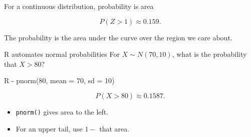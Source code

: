 \documentclass[11pt,aspectratio=169]{beamer}
\begin{document}
\begin{frame}{For a continuous distribution, probability is area}
\begin{center}
\end{center}

\[
P(Z>1)\approx 0.159.
\]

The probability is the \alert{area under the curve} over the region we care about.
\end{frame}

\begin{frame}{R automates normal probabilities}
For $X\sim N(70,10)$, what is the probability that $X>80$?

\begin{block}{R}
 - pnorm(80, mean = 70, sd = 10)
\end{block}

\[
P(X>80)\approx \boxed{0.1587}.
\]

\vfill
\begin{itemize}
  \item \texttt{pnorm()} gives area to the \alert{left}.
  \item For an upper tail, use $1-$ that area.
\end{itemize}
\end{frame}
\end{document}
